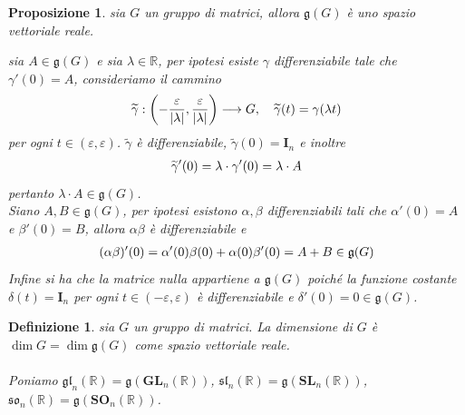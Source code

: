 \documentclass[oneside, 11pt]{amsbook}
\makeatletter
\newcommand{\0}{{(0)}}
\newcommand{\3}{{(3)}}
\theoremstyle{colonplain}
\newtheorem{prop}[thm]{Proposizione}
\theoremstyle{colondefinition}
\newtheorem{defn}[thm]{Definizione}
\theoremstyle{colonremark}
\numberwithin{equation}{chapter}
\renewcommand{\proofname}{Dimostrazione}
\renewenvironment{proof}[1][\proofname]{\par
  \pushQED{\qed}%
  \normalfont \topsep6\p@\@plus6\p@\relax
  \trivlist
  \item[\hskip\labelsep\bfseries #1:]\ignorespaces
}{%
  \popQED\endtrivlist\@endpefalse
}
\makeatother
\begin{document}
\begin{prop} sia $G$ un gruppo di matrici, allora $\mathfrak{g}(G)$ è uno spazio vettoriale reale. \\

\begin{proof} sia $A \in \mathfrak{g}(G)$ e sia $\lambda \in \mathbb{R}$, per ipotesi esiste $\gamma$ differenziabile tale che $\gamma'(0) = A$, consideriamo il cammino
\begin{align}
    \widetilde{\gamma} : \left( -\frac{\varepsilon}{|\lambda|}, \frac{\varepsilon}{|\lambda|} \right) \longrightarrow G, \quad \widetilde{\gamma}(t) = \gamma(\lambda t) \notag
\end{align}
per ogni $t \in (\varepsilon, \varepsilon)$. $\widetilde{\gamma}$ è differenziabile, $\widetilde{\gamma}(0) = \mathbf{I}_n$ e inoltre
\begin{align}
    \widetilde{\gamma}'(0) = \lambda \cdot \gamma'(0) = \lambda \cdot A \notag
\end{align}
pertanto $\lambda \cdot A \in \mathfrak{g}(G)$. \\
Siano $A, B \in \mathfrak{g}(G)$, per ipotesi esistono $\alpha, \beta$ differenziabili tali che $\alpha'(0) = A$ e $\beta'(0) = B$, allora $\alpha\beta$ è differenziabile e
\begin{align}
    (\alpha\beta)'(0) = \alpha'(0)\beta(0) + \alpha(0)\beta'(0) = A + B \in \mathfrak{g}(G) \notag
\end{align}
Infine si ha che la matrice nulla appartiene a $\mathfrak{g}(G)$ poiché la funzione costante $\delta(t) = \mathbf{I}_n$ per ogni $t \in (-\varepsilon, \varepsilon)$ è differenziabile e $\delta'(0) = 0 \in \mathfrak{g}(G)$. \end{proof}
\end{prop}
\begin{defn} sia $G$ un gruppo di matrici. La dimensione di $G$ è $\dim G = \dim \mathfrak{g}(G)$ come spazio vettoriale reale. \\ \\
Poniamo $\mathfrak{gl}_n(\mathbb{R}) = \mathfrak{g}(\mathbf{GL}_n(\mathbb{R}))$, $\mathfrak{sl}_n(\mathbb{R}) = \mathfrak{g}(\mathbf{SL}_n(\mathbb{R}))$, $\mathfrak{so}_n(\mathbb{R}) = \mathfrak{g}(\mathbf{SO}_n(\mathbb{R}))$. \\ \\
\end{defn}
\end{document}

